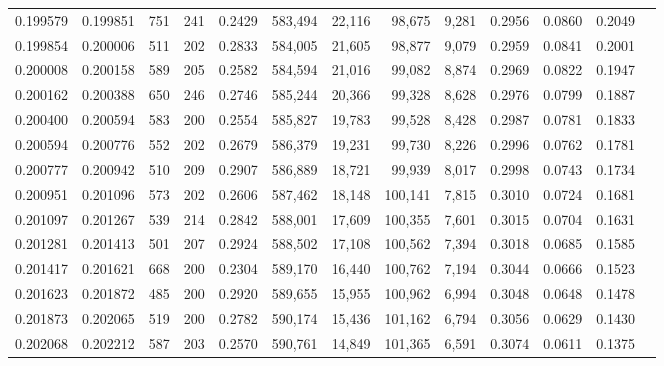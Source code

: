 \begin{tabular}{rrrrrrrrrrrrr}
0.199579 & 0.199851 &   751 & 241 &                                     0.2429 & 583,494 &  22,116 &  98,675 &   9,281 & 0.2956 & 0.0860 & 0.2049 \\
0.199854 & 0.200006 &   511 & 202 &                                     0.2833 & 584,005 &  21,605 &  98,877 &   9,079 & 0.2959 & 0.0841 & 0.2001 \\
0.200008 & 0.200158 &   589 & 205 &                                     0.2582 & 584,594 &  21,016 &  99,082 &   8,874 & 0.2969 & 0.0822 & 0.1947 \\
0.200162 & 0.200388 &   650 & 246 &                                     0.2746 & 585,244 &  20,366 &  99,328 &   8,628 & 0.2976 & 0.0799 & 0.1887 \\
0.200400 & 0.200594 &   583 & 200 &                                     0.2554 & 585,827 &  19,783 &  99,528 &   8,428 & 0.2987 & 0.0781 & 0.1833 \\
0.200594 & 0.200776 &   552 & 202 &                                     0.2679 & 586,379 &  19,231 &  99,730 &   8,226 & 0.2996 & 0.0762 & 0.1781 \\
0.200777 & 0.200942 &   510 & 209 &                                     0.2907 & 586,889 &  18,721 &  99,939 &   8,017 & 0.2998 & 0.0743 & 0.1734 \\
0.200951 & 0.201096 &   573 & 202 &                                     0.2606 & 587,462 &  18,148 & 100,141 &   7,815 & 0.3010 & 0.0724 & 0.1681 \\
0.201097 & 0.201267 &   539 & 214 &                                     0.2842 & 588,001 &  17,609 & 100,355 &   7,601 & 0.3015 & 0.0704 & 0.1631 \\
0.201281 & 0.201413 &   501 & 207 &                                     0.2924 & 588,502 &  17,108 & 100,562 &   7,394 & 0.3018 & 0.0685 & 0.1585 \\
0.201417 & 0.201621 &   668 & 200 &                                     0.2304 & 589,170 &  16,440 & 100,762 &   7,194 & 0.3044 & 0.0666 & 0.1523 \\
0.201623 & 0.201872 &   485 & 200 &                                     0.2920 & 589,655 &  15,955 & 100,962 &   6,994 & 0.3048 & 0.0648 & 0.1478 \\
0.201873 & 0.202065 &   519 & 200 &                                     0.2782 & 590,174 &  15,436 & 101,162 &   6,794 & 0.3056 & 0.0629 & 0.1430 \\
0.202068 & 0.202212 &   587 & 203 &                                     0.2570 & 590,761 &  14,849 & 101,365 &   6,591 & 0.3074 & 0.0611 & 0.1375 \\

\end{tabular}
